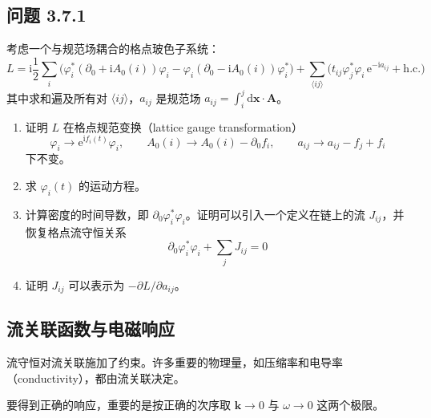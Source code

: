 \subsection*{问题 3.7.1}

考虑一个与规范场耦合的格点玻色子系统：
\begin{equation*}
L=\mathrm{i}\frac{1}{2}\sum_i\big(\varphi_i^*(\partial_0+\mathrm{i}A_0(i))\varphi_i-\varphi_i(\partial_0-\mathrm{i}A_0(i))\varphi_i^*\big)+\sum_{\langle ij\rangle}\big(t_{ij}\varphi_j^*\varphi_i\,\mathrm{e}^{-\mathrm{i}a_{ij}}+\mathrm{h.c.}\big)
\end{equation*}
其中求和遍及所有对 $\langle ij\rangle$，$a_{ij}$ 是规范场 $a_{ij}=\int_i^j\mathrm{d}\pmb{x}\cdot\pmb{A}$。
\begin{enumerate}
\item 证明 $L$ 在格点规范变换（lattice gauge transformation）
\begin{equation*}
\varphi_i\rightarrow\mathrm{e}^{\mathrm{i}f_i(t)}\varphi_i,\qquad A_0(i)\rightarrow A_0(i)-\partial_0f_i,\qquad a_{ij}\rightarrow a_{ij}-f_j+f_i
\end{equation*}
下不变。
\item 求 $\varphi_i(t)$ 的运动方程。
\item 计算密度的时间导数，即 $\partial_0\varphi_i^*\varphi_i$。证明可以引入一个定义在链上的流 $J_{ij}$，并恢复格点流守恒关系
\begin{equation*}
\partial_0\varphi_i^*\varphi_i+\sum_jJ_{ij}=0
\end{equation*}
\item 证明 $J_{ij}$ 可以表示为 $-\partial L/\partial a_{ij}$。
\end{enumerate}

\subsection{流关联函数与电磁响应}

\begin{keypoints}
\item 流守恒对流关联施加了约束。许多重要的物理量，如压缩率和电导率（conductivity），都由流关联决定。
\item 要得到正确的响应，重要的是按正确的次序取 $\pmb{k}\to0$ 与 $\omega\to0$ 这两个极限。
\end{keypoints}

